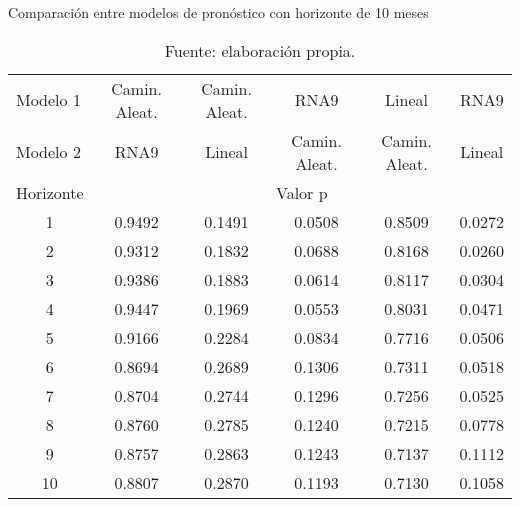 \renewcommand{\baselinestretch}{1.5}
\begin{table}[htb]
  \centering
  \caption{Comparación entre modelos de pronóstico con horizonte de 10 meses}
    \begin{tabular}{cccccc}
    \toprule
    \multicolumn{1}{l}{Modelo 1} & Camin. Aleat. & Camin. Aleat. & RNA9  & Lineal & RNA9 \\
    \multicolumn{1}{l}{Modelo 2} & RNA9  & Lineal & Camin. Aleat. & Camin. Aleat. & Lineal \\
    \midrule
    Horizonte & \multicolumn{5}{c}{Valor p} \\
    \midrule
    \multicolumn{1}{c}{1} & 0.9492 & 0.1491 & 0.0508 & 0.8509 & 0.0272 \\
    \multicolumn{1}{c}{2} & 0.9312 & 0.1832 & 0.0688 & 0.8168 & 0.0260 \\
    \multicolumn{1}{c}{3} & 0.9386 & 0.1883 & 0.0614 & 0.8117 & 0.0304 \\
    \multicolumn{1}{c}{4} & 0.9447 & 0.1969 & 0.0553 & 0.8031 & 0.0471 \\
    \multicolumn{1}{c}{5} & 0.9166 & 0.2284 & 0.0834 & 0.7716 & 0.0506 \\
    \multicolumn{1}{c}{6} & 0.8694 & 0.2689 & 0.1306 & 0.7311 & 0.0518 \\
    \multicolumn{1}{c}{7} & 0.8704 & 0.2744 & 0.1296 & 0.7256 & 0.0525 \\
    \multicolumn{1}{c}{8} & 0.8760 & 0.2785 & 0.1240 & 0.7215 & 0.0778 \\
    \multicolumn{1}{c}{9} & 0.8757 & 0.2863 & 0.1243 & 0.7137 & 0.1112 \\
    \multicolumn{1}{c}{10} & 0.8807 & 0.2870 & 0.1193 & 0.7130 & 0.1058 \\
    \bottomrule
    \end{tabular}%
    \caption*{Fuente: elaboración propia.}
  \label{tab:dmtest}%
\end{table}%
\renewcommand{\baselinestretch}{1.5}
